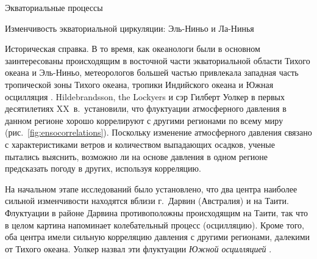 \begin{chapter}{Экваториальные процессы}
\begin{section}{Изменчивость экваториальной циркуляции: Эль-Ниньо и Ла-Нинья}
\begin{paragraph}{Историческая справка.}
В то время, как океанологи были в основном заинтересованы происходящим
в восточной части экваториальной области Тихого океана и Эль-Ниньо, 
метеорологов большей частью привлекала западная часть тропической зоны
Тихого океана, тропики Индийского океана и Южная осцилляция%
. 
Hildebrandsson, the Lockyers и сэр Гилберт Уолкер в первых десятилетиях
XX~в.\ установили, что флуктуации атмосферного давления в данном регионе
хорошо коррелируют с другими регионами по всему миру
(рис.~\ref{fig:ensocorrelations}). 
Поскольку изменение атмосферного давления связано с характеристиками ветров и
количеством выпадающих осадков, ученые пытались выяснить, возможно ли на
основе давления в одном регионе предсказать погоду в других, используя
корреляцию.
%

На начальном этапе исследований было установлено, что два центра наиболее 
сильной изменчивости находятся вблизи г.~Дарвин (Австралия) и на Таити.
Флуктуации в районе Дарвина противоположны происходящим на Таити, так что
в целом картина напоминает колебательный процесс (осцилляцию). Кроме того,
оба центра имели сильную корреляцию давления с другими регионами, далекими
от Тихого океана. Уолкер назвал эти флуктуации \emph{Южной осцилляцией}%
.
%


\end{paragraph}
\end{section}
\end{chapter}
